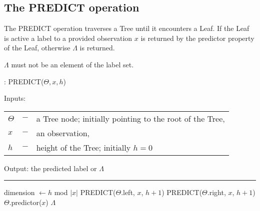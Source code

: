 \subsection{The PREDICT operation}

The PREDICT operation traverses a Tree until it encounters
a Leaf. If the Leaf is active a label to a provided
observation $x$ is returned by the predictor
property of the Leaf, otherwise $\Lambda$ is returned.

$\Lambda$ must not be an element of the label set.

\begin{algorithm}
  \caption{: PREDICT($\Theta, x, h$)}%
  \label{alg:pred}
  Inputs:

    \begin{tabu}{llX}
    $\Theta$ &$-$ &a Tree node; initially pointing to the
      root of the Tree,\\
    $x$ &$-$ &an observation,\\
    $h$ &$-$ &height of the Tree; initially $h = 0$
    \end{tabu}

  Output: the predicted label or $\Lambda$

  \noindent\rule{\linewidth}{0.4pt}

  \begin{algorithmic}[1]
      \STATE dimension $\leftarrow h$ mod $|x|$
        \STATE PREDICT($\Theta$.left, $x$, $h + 1$)
      \ELSE
        \STATE PREDICT($\Theta$.right, $x$, $h + 1$)
      \ENDIF
      \RETURN $\Theta$.predictor($x$)
    \ELSE
      \RETURN $\Lambda$
    \ENDIF
  \end{algorithmic}
\end{algorithm}
